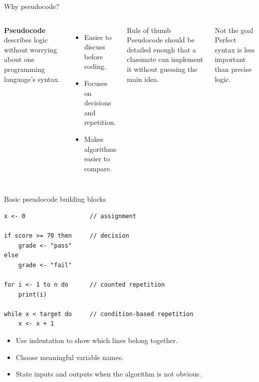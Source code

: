 \documentclass[aspectratio=43,10pt]{beamer}
\begin{document}
\begin{frame}{Why pseudocode?}
  \begin{columns}[T]
      \textbf{Pseudocode} describes logic without worrying about one programming language's syntax.
      \vspace{0.8em}
      \begin{itemize}
        \item Easier to discuss before coding.
        \item Focuses on decisions and repetition.
        \item Makes algorithms easier to compare.
      \end{itemize}
      \begin{block}{Rule of thumb}
        Pseudocode should be detailed enough that a classmate can implement it without guessing the main idea.
      \end{block}
      \vspace{0.5em}
      \begin{alertblock}{Not the goal}
        Perfect syntax is less important than precise logic.
      \end{alertblock}
  \end{columns}
\end{frame}

\begin{frame}[fragile]{Basic pseudocode building blocks}
\begin{lstlisting}[style=pseudo]
x <- 0                  // assignment

if score >= 70 then     // decision
    grade <- "pass"
else
    grade <- "fail"

for i <- 1 to n do      // counted repetition
    print(i)

while x < target do     // condition-based repetition
    x <- x + 1
\end{lstlisting}

\vspace{-0.4em}
\begin{itemize}
  \item Use indentation to show which lines belong together.
  \item Choose meaningful variable names.
  \item State inputs and outputs when the algorithm is not obvious.
\end{itemize}
\end{frame}
\end{document}

